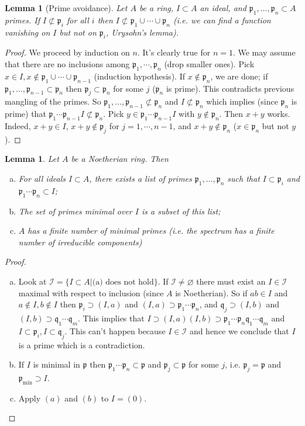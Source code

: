 \documentclass{article}
\newcommand{\fr}{\mathfrak}
\theoremstyle{plain}
\newtheorem{lem}[thm]{Lemma}
\theoremstyle{definition}
\theoremstyle{remark}
\begin{document}
\begin{lem}[Prime avoidance]
\label{L39}
Let $A$ be a ring, $I\subset A$ an ideal, and $\fr p_1,\ldots,\fr p_n\subset A$ primes. If $I\not\subset\fr p_i$ for all $i$ then $I\not\subset\fr p_1\cup\cdots\cup\fr p_n$ (i.e. we can find a function vanishing on $I$ but not on $\fr p_i$, Urysohn's lemma).
\end{lem}
\begin{proof}
We proceed by induction on $n$. It's clearly true for $n=1$. We may assume that there are no inclusions among $\fr p_1,\cdots,\fr p_n$ (drop smaller ones). Pick $x\in I,x\notin\fr p_1\cup\cdots\cup\fr p_{n-1}$ (induction hypothesis). If $x\notin\fr p_n$, we are done; if $\fr p_1,\ldots,\fr p_{n-1}\subset\fr p_n$ then $\fr p_j\subset\fr p_n$ for some $j$ ($\fr p_n$ is prime). This contradicts previous mangling of the primes. So $\fr p_1,\ldots,\fr p_{n-1}\not\subset\fr p_n$ and $I\not\subset\fr p_n$ which implies (since $\fr p_n$ is prime) that $\fr p_1\cdots \fr p_{n-1}I\not\subset\fr p_n$. Pick $y\in\fr p_1\cdots\fr p_{n-1}I$ with $y\notin\fr p_n$. Then $x+y$ works. Indeed, $x+y\in I$, $x+y\notin\fr p_j$ for $j=1,\cdots,n-1$, and $x+y\notin\fr p_n$ ($x\in\fr p_n$ but not $y$).
\end{proof}

\begin{lem}
\label{L40}
Let $A$ be a Noetherian ring. Then
\begin{enumerate}[(a)]
\item For all ideals $I\subset A$, there exists a list of primes $\fr p_1,\ldots, \fr p_n$ such that $I\subset\fr p_i$ and $\fr p_1\cdots\fr p_n\subset I$;
\item The set of primes minimal over $I$ is a subset of this list;
\item $A$ has a finite number of minimal primes (i.e. the spectrum has a finite number of irreducible components)
\end{enumerate}
\end{lem}
\begin{proof}\hspace{1mm}
\begin{enumerate}[(a)]
\item Look at $\mathcal{I}=\{I\subset A | \text{(a) does not hold}\}$. If $\mathcal{I}\neq\varnothing$ there must exist an $I\in\mathcal{I}$ maximal with respect to inclusion (since $A$ is Noetherian). So if $ab\in I$ and $a\notin I,b\notin I$ then $\fr p_i\supset(I,a)$ and $(I,a)\supset\fr p_1\cdots\fr p_n$, and $\fr q_j\supset(I,b)$ and $(I,b)\supset\fr q_1\cdots\fr q_m$. This implies that $I\supset(I,a)(I,b)\supset\fr p_1\cdots\fr p_n\fr q_1\cdots\fr q_m$ and $I\subset\fr p_i,I\subset\fr q_j$. This can't happen because $I\in\mathcal{I}$ and hence we conclude that $I$ is a prime which is a contradiction.
\item If $I$ is minimal in $\fr p$ then $\fr p_1\cdots\fr p_n\subset\fr p$ and $\fr p_j\subset \fr p$ for some $j$, i.e. $\fr p_j=\fr p$ and $\fr p_{\text{min}}\supset I$.
\item Apply $(a)$ and $(b)$ to $I=(0)$.
\end{enumerate}
\end{proof}
\end{document}
